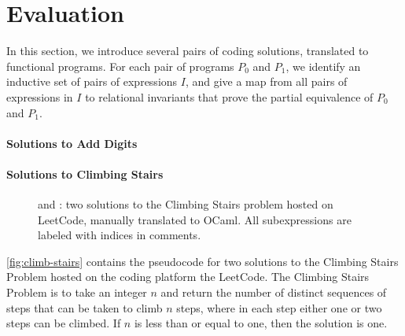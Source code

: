 \section{Evaluation}
\label{sec:evaluation}
%
In this section, we introduce several pairs of coding solutions,
translated to functional programs.
%
For each pair of programs $P_0$ and $P_1$, we identify an inductive
set of pairs of expressions $I$, and give a map from all pairs of
expressions in $I$ to relational invariants that prove the partial
equivalence of $P_0$ and $P_1$.

\paragraph{Solutions to Add Digits}
%

\paragraph{Solutions to Climbing Stairs}
%
\begin{figure}[t]
  \begin{minipage}{0.48\linewidth}
    
  \end{minipage}
  \begin{minipage}{0.48\linewidth}
        
  \end{minipage}
  \caption{ and : two solutions to
    the Climbing Stairs problem hosted on LeetCode, manually translated
    to OCaml.
    All subexpressions are labeled with indices in comments.
  }
  \label{fig:climb-stairs}
\end{figure}
%
\autoref{fig:climb-stairs} contains the pseudocode for two solutions
to the Climbing Stairs Problem hosted on the coding platform the
LeetCode.
The Climbing Stairs Problem is to take an integer $n$ and return the
number of distinct sequences of steps that can be taken to climb $n$
steps, where in each step either one or two steps can be climbed. If
$n$ is less than or equal to one, then the solution is one.
%

